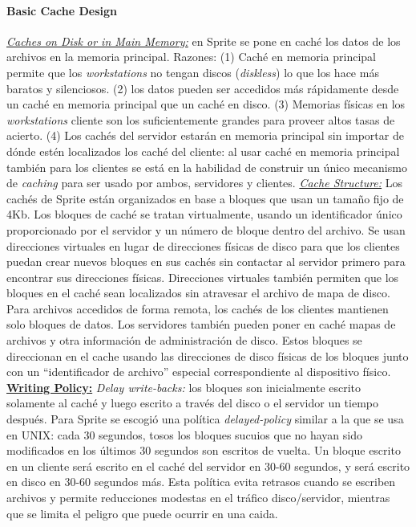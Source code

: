 \paragraph{\textnormal{\textbf{Basic Cache Design}}}
\underline{\emph{Caches on Disk or in Main Memory:}} en Sprite se pone en caché los datos de los archivos en la memoria principal. Razones: (1) Caché en memoria principal permite que los \emph{workstations} no tengan discos (\emph{diskless}) lo que los hace más baratos y silenciosos. (2) los datos pueden ser accedidos más rápidamente desde un caché en memoria principal que un caché en disco. (3) Memorias físicas en los \emph{workstations} cliente son los suficientemente grandes para proveer altos tasas de acierto. (4) Los cachés del servidor estarán en memoria principal sin importar de dónde estén localizados los caché del cliente: al usar caché en memoria principal también para los clientes se está en la habilidad de construir un único mecanismo de \emph{caching} para ser usado por ambos, servidores y clientes. \underline{\emph{Cache Structure:}} Los cachés de Sprite están organizados en base a bloques que usan un tamaño fijo de 4Kb. Los bloques de caché se tratan virtualmente, usando un identificador único proporcionado por el servidor y un número de bloque dentro del archivo. Se usan direcciones virtuales en lugar de direcciones físicas de disco para que los clientes puedan crear nuevos bloques en sus cachés sin contactar al servidor primero para encontrar sus direcciones físicas. Direcciones virtuales también permiten que los bloques en el caché sean localizados sin atravesar el archivo de mapa de disco. Para archivos accedidos de forma remota, los cachés de los clientes mantienen solo bloques de datos. Los servidores también pueden poner en caché mapas de archivos y otra información de administración de disco. Estos bloques se direccionan en el cache usando las direcciones de disco físicas de los bloques junto con un ``identificador de archivo'' especial correspondiente al dispositivo físico. \underline{\textbf{Writing Policy:}} \emph{Delay write-backs:} los bloques son inicialmente escrito solamente al caché y luego escrito a través del disco o el servidor un tiempo después. Para Sprite se escogió una política \emph{delayed-policy} similar a la que se usa en UNIX: cada 30 segundos, tosos los bloques sucuios que no hayan sido modificados en los últimos 30 segundos son escritos de vuelta. Un bloque escrito en un cliente será escrito en el caché del servidor en 30-60 segundos, y será escrito en disco en 30-60 segundos más. Esta política evita retrasos cuando se escriben archivos y permite reducciones modestas en el tráfico disco/servidor, mientras que se limita el peligro que puede ocurrir en una caida. 

